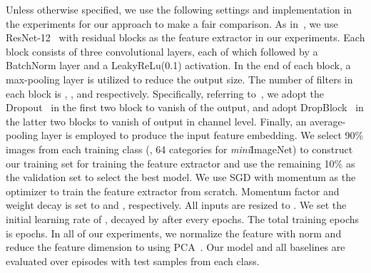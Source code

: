 \documentclass[10pt,letterpaper,twocolumn]{article}
\newcommand{\mypar}[1]{\smallskip\noindent {\bf #1}\enskip}
\begin{document}
\vspace{0.1in}
\mypar{Experimental setup.}
Unless otherwise specified, we use the following settings and implementation  in the experiments for our approach to make a fair comparison. 
As in~\cite{mishra2017simple,oreshkin2018tadam,lee2019meta}, we use ResNet-12~\cite{DBLP:journals/corr/HeZRS15} with  residual blocks as the feature extractor in our experiments. 
Each block consists of three  convolutional layers, each of which followed by a BatchNorm layer and a LeakyReLu(0.1) activation. In the end of each block, a  max-pooling layer is utilized to reduce the output size.
The number of filters in each block is , ,  and  respectively.
Specifically, referring to~\cite{lee2019meta}, we adopt the Dropout~\cite{JMLR:v15:srivastava14a} in the first two block to vanish  of the output,
and adopt DropBlock~\cite{ghiasi2018dropblock} in the latter two blocks to vanish  of output in channel level.
Finally, an average-pooling layer is employed to produce the input feature embedding.
We select 90\% images from each training class (\eg, 64 categories for \textit{mini}ImageNet) to construct our training set for training the feature extractor and use the remaining 10\% as the validation set to select the best model.
We use SGD with momentum as the optimizer to train the feature extractor from scratch.
Momentum factor and  weight decay is set to  and , respectively.
All inputs are resized to .
We set the initial learning rate of , decayed by  after every  epochs.
The total training epochs is  epochs. 
In all of our experiments, we normalize the feature with  norm and reduce the feature dimension to  using PCA~\cite{tipping1999probabilistic}.
Our model and all baselines are evaluated over  episodes with  test samples from each class.
\end{document}
